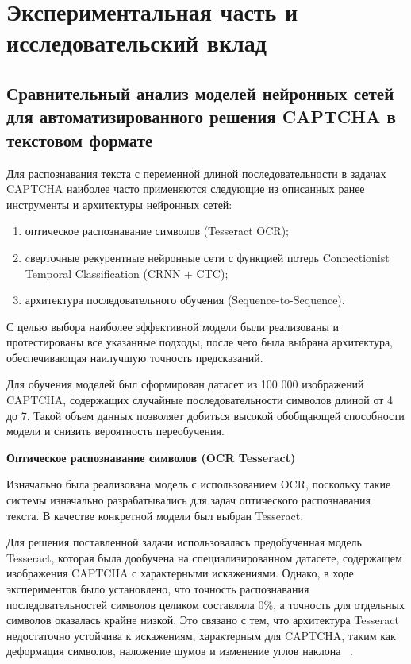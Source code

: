 \chapter{Экспериментальная часть и исследовательский вклад}

\section{Сравнительный анализ моделей нейронных сетей для автоматизированного решения CAPTCHA в текстовом формате}

Для распознавания текста с переменной длиной последовательности в задачах CAPTCHA 
наиболее часто применяются следующие из описанных ранее инструменты и архитектуры 
нейронных сетей:
\begin{enumerate}
    \item оптическое распознавание символов (Tesseract OCR);
    \item cверточные рекурентные нейронные сети с функцией потерь Connectionist 
    Temporal Classification (CRNN + CTC);
    \item архитектура последовательного обучения (Sequence-to-Sequence).
\end{enumerate}

С целью выбора наиболее эффективной модели были реализованы и протестированы все 
указанные подходы, после чего была выбрана архитектура, обеспечивающая наилучшую 
точность предсказаний.

Для обучения моделей был сформирован датасет из 100 000 изображений CAPTCHA, 
содержащих случайные последовательности символов длиной от 4 до 7. Такой объем 
данных позволяет добиться высокой обобщающей способности модели и снизить 
вероятность переобучения.

\textbf{Оптическое распознавание символов (OCR Tesseract)}

Изначально была реализована модель с использованием OCR, поскольку такие системы 
изначально разрабатывались для задач оптического распознавания текста. В качестве 
конкретной модели был выбран Tesseract.

Для решения поставленной задачи использовалась предобученная модель Tesseract, 
которая была дообучена на специализированном датасете, содержащем изображения 
CAPTCHA с характерными искажениями. Однако, в ходе экспериментов было установлено, 
что точность распознавания последовательностей символов целиком составляла 0\%, а 
точность для отдельных символов оказалась крайне низкой. Это связано с тем, что 
архитектура Tesseract недостаточно устойчива к искажениям, характерным для 
CAPTCHA, таким как деформация символов, наложение шумов и изменение углов наклона
~\cite{TrainTesseract}.

